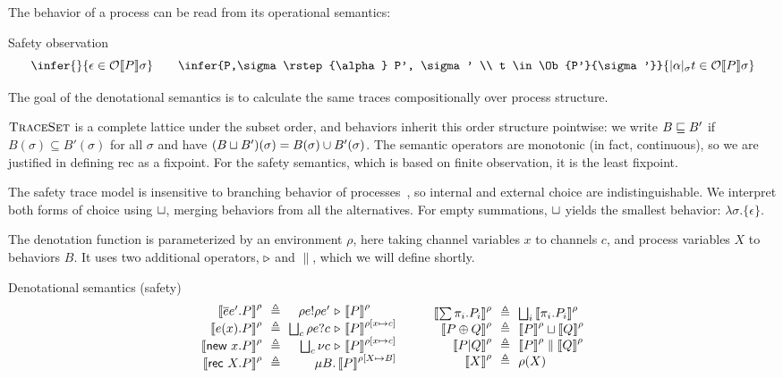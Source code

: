 \documentclass{entcs}
\newcommand{\tr}[1]{}
\begin{document}
The behavior of a process can be read from its operational semantics:
\begin{display}{Safety observation}
\[
\infer
  { }
  {\epsilon \in \Ob{P}{\sigma}}
  \tr{\sr{OEps}}
\qquad
\infer
  {P,\sigma \rstep{\alpha} P', \sigma' \\
   t \in \Ob{P'}{\sigma'}}
  {|\alpha|_\sigma t \in \Ob{P}{\sigma}}
  \tr{\sr{OStep}}
\]
\end{display}
The goal of the denotational semantics is to calculate the same traces
compositionally over process structure.  

$\textsc{TraceSet}$ is a complete lattice under the subset order, and
behaviors inherit this order structure pointwise: we write $B \sqsubseteq
B'$ if $B(\sigma) \subseteq B'(\sigma)$ for all $\sigma$ and have $(B
\sqcup B')(\sigma) = B(\sigma) \cup B'(\sigma)$.  The semantic
operators are monotonic (in fact, continuous), so we are justified
in defining \textsf{rec} as a fixpoint.  For the safety semantics,
which is based on finite observation, it is the least fixpoint.

The safety trace model is insensitive to branching behavior of
processes~\cite{Glabbeek1988}, so internal and external choice are
indistinguishable.  We interpret both forms of choice using $\sqcup$,
merging behaviors from all the alternatives.  For empty summations,
$\sqcup$ yields the smallest behavior: $\lambda \sigma. \{ \epsilon \}$.

The denotation function is parameterized by an environment $\rho$,
here taking channel variables $x$ to channels $c$, and process
variables $X$ to behaviors $B$.  It uses two additional operators,
$\triangleright$ and $\parallel$, which we will define shortly.
\begin{display}
{Denotational semantics (safety)}
\[
\begin{array}{r@{\ \ \eqdef \ \ }r@{\ \pref\ }l}
  \Sem{\ov{e}e'.P}{\rho} & \rho  e ! \rho e' & \Sem{P}{\rho} \\
  \Sem{e(x).P}{\rho}    & \biglub_c \rho e ? c & \Sem{P}{\rho[x \mapsto c]} \\
  \Sem{\new x.P}{\rho}  & \biglub_c \nu c & \Sem{P}{\rho[x \mapsto c]} \\
  \Sem{\rec X.P}{\rho}   & \multicolumn{2}{r}{\mu B. \Sem{P}{\rho[X \mapsto B]}}
\end{array}
\qquad
\begin{array}{r@{\ \ \eqdef\ \ }l}
  \Sem{\sum \pi_i.P_i}{\rho} & \biglub_i \Sem{\pi_i.P_i}{\rho} \\
  \Sem{P \nc Q}{\rho}     & \Sem{P}{\rho} \lub \Sem{Q}{\rho} \\
  \Sem{P | Q}{\rho}     & \Sem{P}{\rho} \parallel \Sem{Q}{\rho} \\
  \Sem{X}{\rho}         & \rho(X) 
\end{array}
\]
\end{display}
\end{document}
